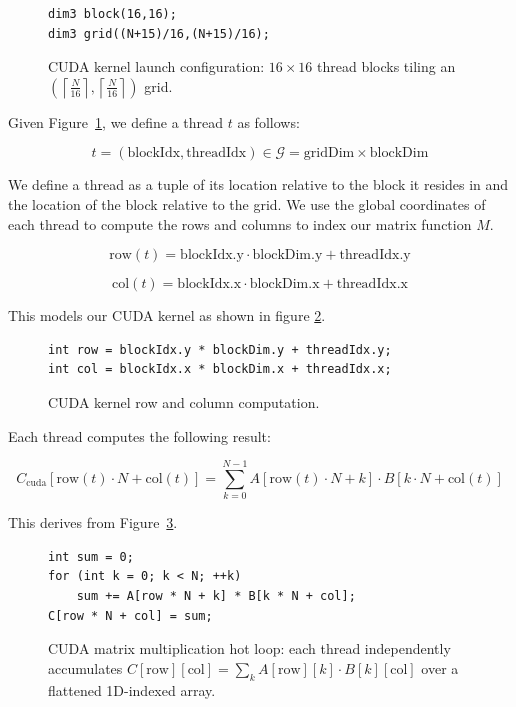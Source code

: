 \documentclass{article}
\begin{document}
\begin{figure}[H]
\begin{verbatim}
dim3 block(16,16);
dim3 grid((N+15)/16,(N+15)/16);
\end{verbatim}
\caption{CUDA kernel launch configuration: $16\times16$ thread blocks tiling an $\left(\left\lceil \frac{N}{16} \right\rceil, \left\lceil \frac{N}{16} \right\rceil\right)$ grid.}
\label{fig:mat_launch_config}
\end{figure}

Given Figure~\ref{fig:mat_launch_config}, we define a thread $t$ as follows:

$$t = (\text{blockIdx}, \text{threadIdx}) \in \mathcal{G} = \text{gridDim} \times \text{blockDim}$$

We define a thread as a tuple of its location relative to the block it resides in and the location of the block relative to the grid. We use the global coordinates of each thread to compute the rows and columns to index our matrix function $M$.

$$\text{row}(t) = \text{blockIdx.y} \cdot \text{blockDim.y} + \text{threadIdx.y}$$

$$\text{col}(t) = \text{blockIdx.x} \cdot \text{blockDim.x} + \text{threadIdx.x}$$

This models our CUDA kernel as shown in figure \ref{fig:mat_tid}.

\begin{figure}[H]
\begin{verbatim}
int row = blockIdx.y * blockDim.y + threadIdx.y;
int col = blockIdx.x * blockDim.x + threadIdx.x;
\end{verbatim}
\caption{CUDA kernel row and column computation.}
\label{fig:mat_tid}
\end{figure}

Each thread computes the following result:

$$C_{\text{cuda}}[\text{row}(t) \cdot N + \text{col}(t)] = \sum_{k=0}^{N-1} A[\text{row}(t) \cdot N + k] \cdot B[k \cdot N + \text{col}(t)]$$

This derives from Figure~\ref{fig:mat_hotloop}.

\begin{figure}[H]
\begin{verbatim}
int sum = 0;
for (int k = 0; k < N; ++k)
    sum += A[row * N + k] * B[k * N + col];
C[row * N + col] = sum;
\end{verbatim}
\caption{CUDA matrix multiplication hot loop: each thread independently accumulates $C[\text{row}][\text{col}] = \sum_k A[\text{row}][k]\cdot B[k][\text{col}]$ over a flattened 1D-indexed array.}
\label{fig:mat_hotloop}
\end{figure}
\end{document}
